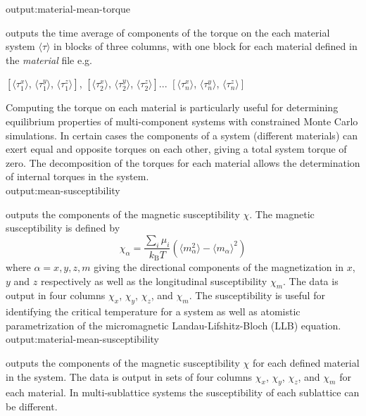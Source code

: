 
{\zicf output:material-mean-torque}
outputs the time average of components of the torque on the each material system $\langle\tau\rangle$
in blocks of three columns, with one block for each material defined in the \textit{material} file e.g.

\begin{center}
$\left[ \langle\tau_1^x \rangle \right.$, $\langle\tau_1^y \rangle$, $\left. \langle\tau_1^z \rangle \right]$,
$\left[ \langle\tau_2^x \rangle \right.$, $\langle\tau_2^y \rangle$, $\left. \langle\tau_2^z \rangle \right]$...
$\left[ \langle\tau_n^x \rangle \right.$, $\langle\tau_n^y \rangle$, $\left. \langle\tau_n^z \rangle \right]$
\end{center}

Computing the torque on each material is particularly useful for determining equilibrium
properties of multi-component systems with constrained Monte Carlo simulations. In certain
cases the components of a system (different materials) can exert equal and opposite torques
on each other, giving a total system torque of zero. The decomposition of the torques for
each material allows the determination of internal torques in the system.\\

{\zicf output:mean-susceptibility}
outputs the components of the magnetic susceptibility $\chi$. The magnetic susceptibility is defined by
\begin{equation*}
\chi_{\alpha} = \frac{\sum_i \mu_i}{k_{\mathrm{B}}T}\left(\langle m_{\alpha}^2\rangle - \langle m_{\alpha}\rangle^2 \right)
\end{equation*}
where $\alpha = x,y,z,m$ giving the directional components of the magnetization in $x$, $y$ and $z$
respectively as well as the longitudinal susceptibility $\chi_m$. The data is output in four columns
$\chi_x$, $\chi_y$, $\chi_z$, and $\chi_m$. The susceptibility is useful for identifying the critical
temperature for a system as well as atomistic parametrization of the micromagnetic
Landau-Lifshitz-Bloch (LLB) equation.\\

{\zicf output:material-mean-susceptibility} outputs
the components of the magnetic susceptibility $\chi$ for each defined material in the system. The data is output in sets of
four columns $\chi_x$, $\chi_y$, $\chi_z$, and $\chi_m$ for each material. In multi-sublattice systems the susceptibility of
each sublattice can be different.\\

